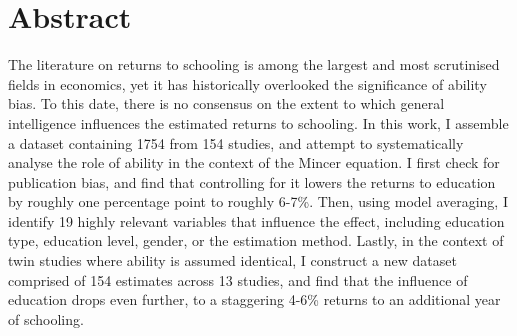 \documentclass [a4paper,12pt]{report}
\begin{document}
\section*{Abstract}
The literature on returns to schooling is among the largest and most scrutinised fields in economics, yet it has historically overlooked the significance of ability bias. To this date, there is no consensus on the extent to which general intelligence influences the estimated returns to schooling. In this work, I assemble a dataset containing 1754 from 154 studies, and attempt to systematically analyse the role of ability in the context of the Mincer equation. I first check for publication bias, and find that controlling for it lowers the returns to education by roughly one percentage point to roughly 6-7\%. Then, using model averaging, I identify 19 highly relevant variables that influence the effect, including education type, education level, gender, or the estimation method. Lastly, in the context of twin studies  where ability is assumed identical, I construct a new dataset comprised of 154 estimates across 13 studies, and find that the influence of education drops even further, to a staggering 4-6\% returns to an additional year of schooling.
\end{document}
